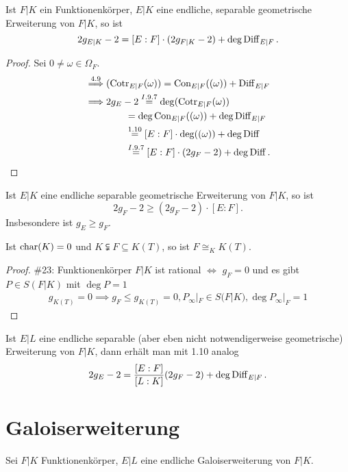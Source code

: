 \begin{theorem}
    Ist $F|K$ ein Funktionenkörper, $E|K$ eine endliche, separable geometrische Erweiterung von $F|K$, so ist
    $$ 2g_{E|K} - 2 = [E:F] \cdot (2g_{F|K} - 2) + \deg \operatorname{Diff}_{E|F}. $$
\end{theorem}
\begin{proof}
    Sei $0 \ne \omega \in \Omega_F$.
    \begin{align*}
        \stackrel{4.9}{\implies} & (\operatorname{Cotr}_{E|F}(\omega)) = \operatorname{Con}_{E|F}((\omega)) + \operatorname{Diff}_{E|F}\\
        \implies & 2g_E - 2 \stackrel{I.9.7}{=} \deg(\operatorname{Cotr}_{E|F}(\omega)) \\
        & \qquad = \deg \operatorname{Con}_{E|F}((\omega)) + \deg \operatorname{Diff}_{E|F}\\
        & \qquad \stackrel{1.10}{=} [E:F] \cdot \deg ((\omega)) + \deg \operatorname{Diff}\\
        & \qquad \stackrel{I.9.7}{=} [E:F] \cdot (2g_F - 2) + \deg \operatorname{Diff}.
    \end{align*}
\end{proof}

\begin{korollar}
    Ist $E|K$ eine endliche separable geometrische Erweiterung von $F|K$, so ist
    $$ 2g_F - 2 \geq (2g_F - 2)\cdot [E:F].$$
    Insbesondere ist $g_E \geq g_F$.
\end{korollar}

\begin{korollar}
    Ist $\operatorname{char}(K) = 0$ und $K \subsetneqq F \subseteq K(T)$, so ist $F \cong_K K(T)$.
\end{korollar}
\begin{proof}
    \#23: Funktionenkörper $F|K$ ist rational $\iff$ $g_F=0$ und es gibt $P \in S(F|K)$ mit $\deg P = 1$
    \begin{align*}
        g_{K(T)} = 0 \implies g_F \leq g_{K(T)} = 0, P_\infty|_F \in S(F|K), \deg P_\infty|_F = 1
    \end{align*}
\end{proof}

\begin{bemerkungnr}
    Ist $E|L$ eine endliche separable (aber eben nicht notwendigerweise geometrische) Erweiterung von $F|K$, dann erhält man 
    mit 1.10 analog 
    $$ 2g_E-2=\frac{[E:F]}{[L:K]}(2g_F - 2) + \deg \operatorname{Diff}_{E|F}. $$
\end{bemerkungnr}

\section{Galoiserweiterung}
Sei $F|K$ Funktionenkörper, $E|L$ eine endliche Galoiserweiterung von $F|K$.

